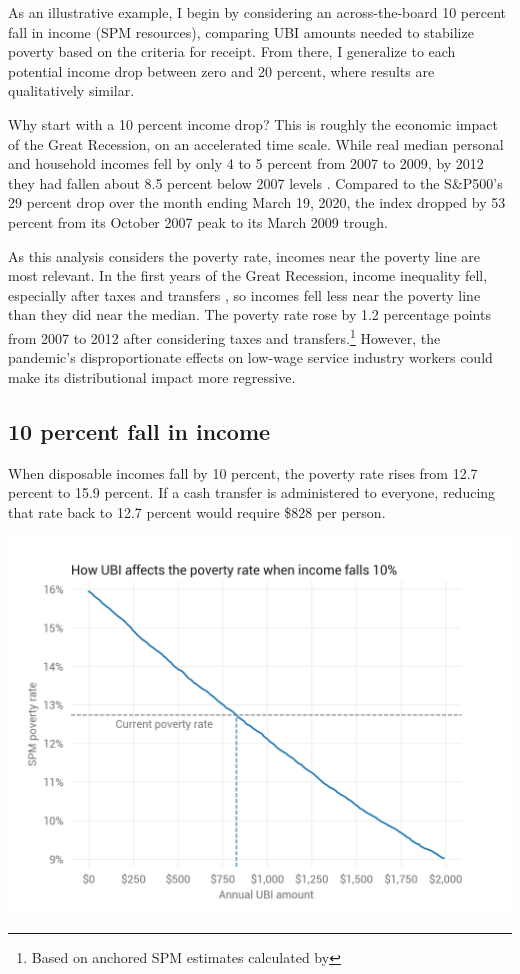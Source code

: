 \documentclass[12pt]{article}
\begin{document}
As an illustrative example, I begin by considering an across-the-board 10 percent fall in income (SPM resources), comparing UBI amounts needed to stabilize poverty based on the criteria for receipt. From there, I generalize to each potential income drop between zero and 20 percent, where results are qualitatively similar.

Why start with a 10 percent income drop? This is roughly the economic impact of the Great Recession, on an accelerated time scale. While real median personal and household incomes fell by only 4 to 5 percent from 2007 to 2009, by 2012 they had fallen about 8.5 percent below 2007 levels \cite{fred_income}. Compared to the S\&P500's 29 percent drop over the month ending March 19, 2020, the index dropped by 53 percent from its October 2007 peak to its March 2009 trough.

As this analysis considers the poverty rate, incomes near the poverty line are most relevant. In the first years of the Great Recession, income inequality fell, especially after taxes and transfers \cite{cbo}, so incomes fell less near the poverty line than they did near the median. The poverty rate rose by 1.2 percentage points from 2007 to 2012 after considering taxes and transfers.\footnote{Based on anchored SPM estimates calculated by } However, the pandemic's disproportionate effects on low-wage service industry workers could make its distributional impact more regressive.

\subsection{10 percent fall in income} \label{sec:10pctfall}

When disposable incomes fall by 10 percent, the poverty rate rises from 12.7 percent to 15.9 percent. If a cash transfer is administered to everyone, reducing that rate back to 12.7 percent would require \$828 per person.

\begin{center}
\includegraphics[width=15cm]{../charts/pov_rate_by_ubi_10pct_all.png}
\label{fig:pov_rate_by_ubi_10pct_all}
\end{center}
\end{document}
